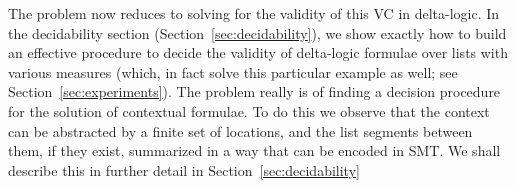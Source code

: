 The problem now reduces to solving for the validity of this VC in delta-logic. In the decidability section (Section~\ref{sec:decidability}), we show exactly how to build an effective procedure to decide the validity of delta-logic formulae over lists with various measures (which, in fact solve this particular example as well; see Section~\ref{sec:experiments}). The problem really is of finding a decision procedure for the solution of contextual formulae. To do this we observe that the context can be abstracted by a finite set of locations, and the list segments between them, if they exist, summarized in a way that can be encoded in SMT. We shall describe this in further detail in Section~\ref{sec:decidability}
